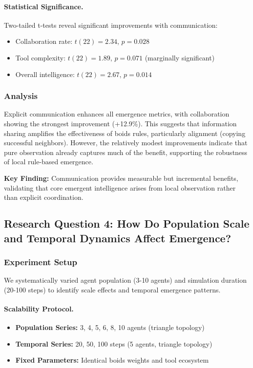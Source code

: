 \paragraph{Statistical Significance.}
Two-tailed t-tests reveal significant improvements with communication:
\begin{itemize}
    \item Collaboration rate: $t(22) = 2.34$, $p = 0.028$
    \item Tool complexity: $t(22) = 1.89$, $p = 0.071$ (marginally significant)
    \item Overall intelligence: $t(22) = 2.67$, $p = 0.014$
\end{itemize}

\subsubsection{Analysis}

Explicit communication enhances all emergence metrics, with collaboration showing the strongest improvement (+12.9\%). This suggests that information sharing amplifies the effectiveness of boids rules, particularly alignment (copying successful neighbors). However, the relatively modest improvements indicate that pure observation already captures much of the benefit, supporting the robustness of local rule-based emergence.

\textbf{Key Finding:} Communication provides measurable but incremental benefits, validating that core emergent intelligence arises from local observation rather than explicit coordination.

\subsection{Research Question 4: How Do Population Scale and Temporal Dynamics Affect Emergence?}

\subsubsection{Experiment Setup}
We systematically varied agent population (3-10 agents) and simulation duration (20-100 steps) to identify scale effects and temporal emergence patterns.

\paragraph{Scalability Protocol.}
\begin{itemize}
    \item \textbf{Population Series:} 3, 4, 5, 6, 8, 10 agents (triangle topology)
    \item \textbf{Temporal Series:} 20, 50, 100 steps (5 agents, triangle topology)
    \item \textbf{Fixed Parameters:} Identical boids weights and tool ecosystem
\end{itemize}

